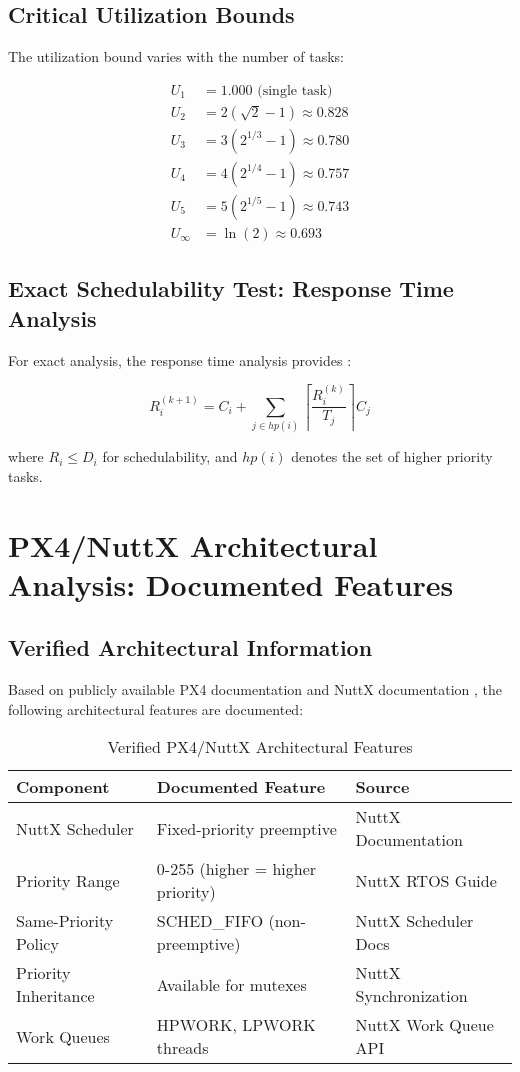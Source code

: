 \documentclass[12pt,a4paper]{article}
\begin{document}
\subsection{Critical Utilization Bounds}

The utilization bound varies with the number of tasks:

\begin{align}
U_1 &= 1.000 \text{ (single task)} \\
U_2 &= 2(\sqrt{2} - 1) \approx 0.828 \\
U_3 &= 3(2^{1/3} - 1) \approx 0.780 \\
U_4 &= 4(2^{1/4} - 1) \approx 0.757 \\
U_5 &= 5(2^{1/5} - 1) \approx 0.743 \\
U_{\infty} &= \ln(2) \approx 0.693
\end{align}

\subsection{Exact Schedulability Test: Response Time Analysis}

For exact analysis, the response time analysis provides \cite{audsley1993}:

\begin{equation}
R_i^{(k+1)} = C_i + \sum_{j \in hp(i)} \left\lceil \frac{R_i^{(k)}}{T_j} \right\rceil C_j
\end{equation}

where $R_i \leq D_i$ for schedulability, and $hp(i)$ denotes the set of higher priority tasks.

\section{PX4/NuttX Architectural Analysis: Documented Features}

\subsection{Verified Architectural Information}

Based on publicly available PX4 documentation \cite{px4dev} and NuttX documentation \cite{nuttx}, the following architectural features are documented:

\begin{table}[H]
\centering
\begin{tabular}{|l|l|l|}
\hline
\textbf{Component} & \textbf{Documented Feature} & \textbf{Source} \\
\hline
NuttX Scheduler & Fixed-priority preemptive & NuttX Documentation \\
Priority Range & 0-255 (higher = higher priority) & NuttX RTOS Guide \\
Same-Priority Policy & SCHED\_FIFO (non-preemptive) & NuttX Scheduler Docs \\
Priority Inheritance & Available for mutexes & NuttX Synchronization \\
Work Queues & HPWORK, LPWORK threads & NuttX Work Queue API \\
\hline
\end{tabular}
\caption{Verified PX4/NuttX Architectural Features}
\end{table}
\end{document}
